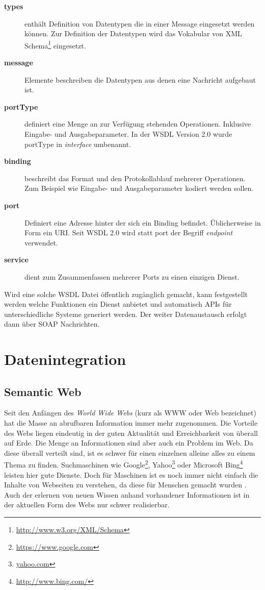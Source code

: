 \begin{description}
    \item[\textbf{types}] enthält Definition von Datentypen die in einer Message eingesetzt werden können. Zur Definition der Datentypen wird das Vokabular von XML Schema\footnote{\url{http://www.w3.org/XML/Schema}} eingesetzt.
    \item[\textbf{message}] Elemente beschreiben die Datentypen aus denen eine Nachricht aufgebaut ist.
    \item[\textbf{portType}] definiert eine Menge an zur Verfügung stehenden Operationen. Inklusive Eingabe- und Ausgabeparameter. In der WSDL Version 2.0 wurde portType in \emph{interface} umbenannt.
    \item[\textbf{binding}] beschreibt das Format und den Protokollablauf mehrerer Operationen. Zum Beispiel wie Eingabe- und Ausgabeparameter kodiert werden sollen. 
    \item[\textbf{port}] Definiert eine Adresse hinter der sich ein Binding befindet. Üblicherweise in Form ein URI. Seit WSDL 2.0 wird statt port der Begriff \emph{endpoint} verwendet.
    \item[\textbf{service}] dient zum Zusammenfassen mehrerer Ports zu einen einzigen Dienst.
\end{description}

Wird eine solche WSDL Datei öffentlich zugänglich gemacht, kann festgestellt werden welche Funktionen ein Dienst anbietet und automatisch APIs für unterschiedliche Systeme generiert werden. Der weiter Datenaustausch erfolgt dann über SOAP Nachrichten.



\section{Datenintegration} %
\label{sec:datenintegration}


\subsection{Semantic Web} %
\label{sub:semantic_web}

Seit den Anfängen des \emph{World Wide Webs} (kurz als WWW oder Web bezeichnet) hat die Masse an abrufbaren Information immer mehr zugenommen. Die Vorteile des Webs liegen eindeutig in der guten Aktualität und Erreichbarkeit von überall auf Erde. Die Menge an Informationen sind aber auch ein Problem im Web. Da diese überall verteilt sind, ist es schwer für einen einzelnen alleine alles zu einem Thema zu finden. Suchmaschinen wie Google\footnote{\url{https://www.google.com}}, Yahoo\footnote{\url{yahoo.com}} oder Microsoft Bing\footnote{\url{http://www.bing.com/}} leisten hier gute Dienste. Doch für Maschinen ist es noch immer nicht einfach die Inhalte von Webseiten zu verstehen, da diese für Menschen gemacht wurden \cite{Hitzler2008a}. Auch der erlernen von neuen Wissen anhand vorhandener Informationen ist in der aktuellen Form des Webs nur schwer realisierbar. 

